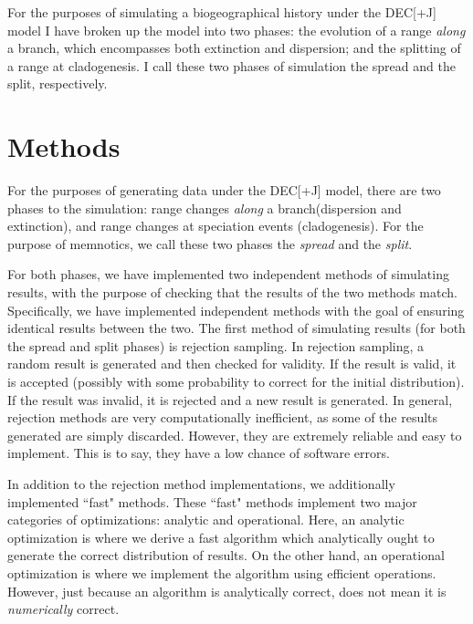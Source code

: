 \documentclass[a4paper]{article}
\newcommand{\decj}{DEC[+J]}
\begin{document}
For the purposes of simulating a biogeographical history under the \decj{} model I have broken up the model into two
phases: the evolution of a range \textit{along} a branch, which encompasses both extinction and dispersion; and the
splitting of a range at cladogenesis.
I call these two phases of simulation the spread and the split, respectively.


\section{Methods}

For the purposes of generating data under the DEC[+J] model, there are two
phases to the simulation: range changes \textit{along} a branch(dispersion and
extinction), and range changes at speciation events (cladogenesis).
For the purpose of memnotics, we call these two phases the \textit{spread} and
the \textit{split}.

For both phases, we have implemented two independent methods of simulating
results, with the purpose of checking that the results of the two methods match.
Specifically, we have implemented independent methods with the goal of ensuring
identical results between the two.
The first method of simulating results (for both the spread and split phases) is
rejection sampling.
In rejection sampling, a random result is generated and then checked for
validity.
If the result is valid, it is accepted (possibly with some probability to
correct for the initial distribution).
If the result was invalid, it is rejected and a new result is generated.
In general, rejection methods are very computationally inefficient, as some of
the results generated are simply discarded. 
However, they are extremely reliable and easy to implement.
This is to say, they have a low chance of software errors.

In addition to the rejection method implementations, we additionally implemented 
``fast" methods.
These ``fast" methods implement two major categories of optimizations: analytic
and operational.
Here, an analytic optimization is where we derive a fast algorithm which
analytically ought to generate the correct distribution of results.
On the other hand, an operational optimization is where we implement the
algorithm using efficient operations.
However, just because an algorithm is analytically correct, does not mean it is
\textit{numerically} correct\cite{goldberg_what_1991, noauthor_ieee_1985}.
\end{document}
